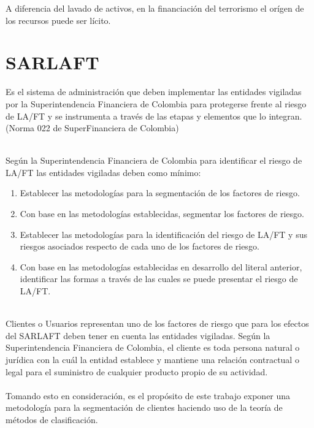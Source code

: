 A diferencia del lavado de activos, en la financiación del terrorismo el orígen de los recursos puede ser lícito.

\section{SARLAFT}

Es el sistema de administración que deben implementar las entidades vigiladas por la Superintendencia Financiera de Colombia para protegerse frente al riesgo de LA/FT y se instrumenta a través de las etapas y elementos que lo integran. (Norma 022 de SuperFinanciera de Colombia)

\ \\
Según la Superintendencia Financiera de Colombia para identificar el riesgo de LA/FT las entidades vigiladas deben como mínimo:
\begin{enumerate}
  \item Establecer las metodologías para la segmentación de los factores de riesgo.
  \item Con base en las metodologías establecidas, segmentar los factores de riesgo.
  \item Establecer las metodologías para la identificación del riesgo de LA/FT y sus riesgos asociados respecto de cada uno de los factores de riesgo.
  \item Con base en las metodologías establecidas en desarrollo del literal anterior, identificar las formas a
      través de las cuales se puede presentar el riesgo de LA/FT.
\end{enumerate}
\ \\
Clientes o Usuarios representan uno de los factores de riesgo que para los efectos del SARLAFT deben tener en cuenta las entidades vigiladas. Según la Superintendencia Financiera de Colombia, el cliente es toda persona natural o jurídica con la cuál la entidad establece y mantiene una relación contractual o legal para el suministro de cualquier producto propio de su actividad.
\ \\
\ \\
Tomando esto en consideración, es el propósito de este trabajo exponer una metodología para la segmentación de clientes haciendo uso de la teoría de métodos de clasificación.


\clearemptydoublepage
